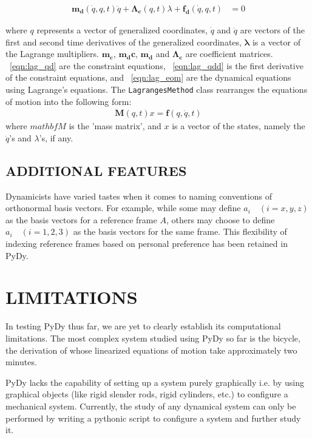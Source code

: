 \documentclass[twocolumn,10pt]{asme2e}
\begin{document}
\label{eqn:lag_eom}
\begin{align}
    \mathbf{m_d}(\dot{q}, q, t) \ddot{q} + \mathbf{\Lambda_c}(q, t)
        \lambda + \mathbf{f_d}(\dot{q}, q, t) &= 0
\end{align}

where $q$ represents a vector of generalized coordinates, $\dot{q}$ and
$\ddot{q}$ are vectors of the first and second time derivatives of the
generalized coordinates, $\mathbf{\lambda}$ is a vector of the Lagrange
multipliers. $\mathbf{m_c}$, $\mathbf{m_dc}$, $\mathbf{m_d}$ and
$\mathbf{\Lambda_c}$ are coefficient matrices.
~\ref{eqn:lag_qd} are the constraint equations, ~\ref{eqn:lag_qdd} is the
first derivative of the constraint equations, and ~\ref{eqn:lag_eom} are
the dynamical equations using Lagrange's equations. The
\verb|LagrangesMethod| class rearranges the equations of motion into the
following form:
\label{eqn:lag_rearr}
\begin{align}
    \mathbf{M}(q, t) x = \mathbf{f}(q, \dot{q}, t)
\end{align}
where $mathbf{M}$ is the 'mass matrix', and $x$ is a vector of the states,
namely the $\ddot{q}$'s and $\lambda$'s, if any.

\subsection*{ADDITIONAL FEATURES}
Dynamicists have varied tastes when it comes to naming conventions of
orthonormal basis vectors. For example, while some may define $a_i
\quad (i=x,y,z)$ as the basis vectors for a reference frame $A$, others may
choose to define $a_i \quad (i=1,2,3)$ as the basis vectors for the same frame.
This flexibility of indexing reference frames based on personal preference has
been retained in PyDy.

\section*{LIMITATIONS}
In testing PyDy thus far, we are yet to clearly establish its computational
limitations. The most complex system studied using PyDy so far is the bicycle,
the derivation of whose linearized equations of motion take approximately
two minutes.

PyDy lacks the capability of setting up a system purely graphically i.e. by
using graphical objects (like rigid slender rods, rigid cylinders, etc.) to
configure a mechanical system. Currently, the study of any dynamical system
can only be performed by writing a pythonic script to configure a system and
further study it.
\end{document}
